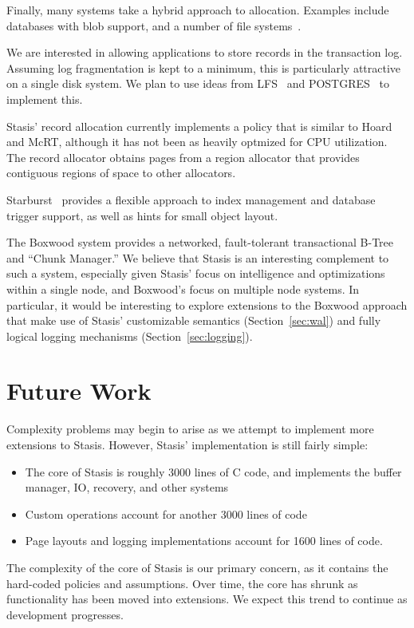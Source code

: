 \documentclass[letterpaper,twocolumn,10pt]{article}
\newcommand{\yad}{Stasis\xspace}
\newcommand{\yads}{Stasis'\xspace}
\begin{document}
Finally, many systems take a hybrid approach to allocation.  Examples include
databases with blob support, and a number of
file systems~\cite{reiserfs,ffs}.

We are interested in allowing applications to store records in
the transaction log.  Assuming log fragmentation is kept to a
minimum, this is particularly attractive on a single disk system.  We
plan to use ideas from LFS~\cite{lfs} and POSTGRES~\cite{postgres}
to implement this.

\yads record allocation currently implements a policy that is similar
to Hoard and McRT, although it has not been as heavily optmized for
CPU utilization.  The record allocator obtains pages from a region
allocator that provides contiguous regions of space to other
allocators.

Starburst~\cite{starburst} provides a flexible approach to index
management and database trigger support, as well as hints for small
object layout.

The Boxwood system provides a networked, fault-tolerant transactional
B-Tree and ``Chunk Manager.''  We believe that \yad is an interesting
complement to such a system, especially given \yads focus on
intelligence and optimizations within a single node, and Boxwood's
focus on multiple node systems.  In particular, it would be
interesting to explore extensions to the Boxwood approach that make
use of \yads customizable semantics (Section~\ref{sec:wal}) and fully logical logging
mechanisms (Section~\ref{sec:logging}).




\section{Future Work}

Complexity problems may begin to arise as we attempt to implement more
extensions to \yad.  However, \yads implementation is still fairly simple:

\begin{itemize}
\item The core of \yad is roughly 3000 lines
of C code, and implements the buffer manager, IO, recovery, and other
systems
\item Custom operations account for another 3000 lines of code
\item Page layouts and logging implementations account for 1600 lines of code.
\end{itemize}

The complexity of the core of \yad is our primary concern, as it
contains the hard-coded policies and assumptions.  Over time, the core has
shrunk as functionality has been moved into extensions.  We expect
this trend to continue as development progresses.  
\end{document}
